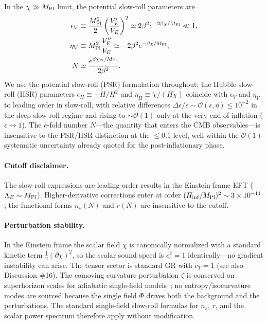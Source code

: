 \documentclass[pdflatex,sn-mathphys-num]{sn-jnl}
\newcommand{\MP}{M_{\rm Pl}}
\theoremstyle{thmstyleone}
\begin{document}
In the $\chi\gg\MP$ limit, the potential slow-roll parameters are
\begin{align}
\epsilon_V&\equiv\frac{\MP^2}{2}\left(\frac{V_E'}{V_E}\right)^2
\simeq2\beta^2 e^{-2\beta\chi/\MP}\ll1,\\
\eta_V&\equiv\MP^2\frac{V_E''}{V_E}
\simeq-2\beta^2 e^{-\beta\chi/\MP},\\
N&\simeq\frac{e^{\beta\chi_N/\MP}}{2\beta^2}.
\label{eq:slowroll}
\end{align}
We use the potential slow-roll (PSR) formulation throughout; the Hubble slow-roll (HSR) parameters $\epsilon_H\equiv-\dot H/H^2$ and $\eta_H\equiv\ddot\chi/(H\dot\chi)$ coincide with $\epsilon_V$ and $\eta_V$ to leading order in slow-roll, with relative differences $\Delta\epsilon/\epsilon\sim\mathcal{O}(\epsilon,\eta)\leq10^{-2}$ in the deep slow-roll regime and rising to $\sim\mathcal{O}(1)$ only at the very end of inflation ($\epsilon\to1$). The $e$-fold number $N$---the quantity that enters the CMB observables---is insensitive to the PSR/HSR distinction at the $\leq0.1$ level, well within the $\mathcal{O}(1)$ systematic uncertainty already quoted for the post-inflationary phase.

\paragraph{Cutoff disclaimer.} The slow-roll expressions are leading-order results in the Einstein-frame EFT ($\Lambda_E\sim\MP$). Higher-derivative corrections enter at order $(H_{\rm inf}/\MP)^2\sim3\times10^{-11}$; the functional forms $n_s(N)$ and $r(N)$ are insensitive to the cutoff.

\paragraph{Perturbation stability.} In the Einstein frame the scalar field $\chi$ is canonically normalized with a standard kinetic term $\frac12(\partial\chi)^2$, so the scalar sound speed is $c_s^2=1$ identically---no gradient instability can arise. The tensor sector is standard GR with $c_T=1$ (see also Discussion \#16). The comoving curvature perturbation $\zeta$ is conserved on superhorizon scales for adiabatic single-field models~\cite{LiddleLyth2000}; no entropy/isocurvature modes are sourced because the single field $\Phi$ drives both the background and the perturbations. The standard single-field slow-roll formulas for $n_s$, $r$, and the scalar power spectrum therefore apply without modification.
\end{document}
